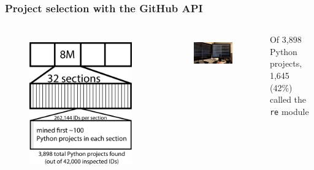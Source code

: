 \begin{frame}
\frametitle{Project selection with the GitHub API}
\begin{columns}[t]
\begin{figure}[ht]
  \includegraphics[scale=0.16]{../nontex/illustrations/32Divided.pdf}
  \label{fig:32Divided}
\end{figure}
\begin{figure}[ht]
  \includegraphics[width=\linewidth]{../nontex/smallScrapersPNG/smallScrapers-112}
    \label{fig:scraper}
\end{figure}
Of 3,898 Python projects, 1,645 (42\%) called the {\tt re} module
\end{columns}
\end{frame}

